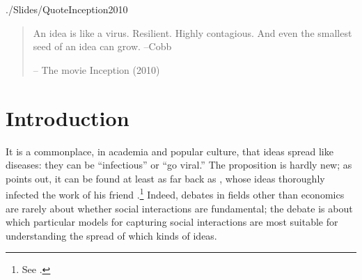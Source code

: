 \begin{frontmatter}
\begin{verbatimwrite}{./Slides/QuoteInception2010}%
\begin{quote}
An idea is like a virus. Resilient. Highly contagious. And even the smallest seed of an idea can grow.   --Cobb

\medskip \indent --
      The movie Inception (2010)
\end{quote}
\end{verbatimwrite} %


\end{frontmatter}%

\section{Introduction}
\label{chap1:sec1}

It is a commonplace, in academia and popular culture, that ideas spread like diseases: they can be ``infectious'' or ``go viral.''  The proposition is hardly new; as \cite{shiller2017narrative} points out, it can be found at least as far back as \cite{humeenquiry},
 whose ideas thoroughly infected the work of his friend \cite{smithwealth}.\footnote{See \cite{rasmussen2017infidel}.} Indeed, %
 debates in fields other than economics are rarely about whether social interactions are fundamental; the debate is about which particular models for capturing social interactions are most suitable for understanding the spread of which kinds of ideas.

